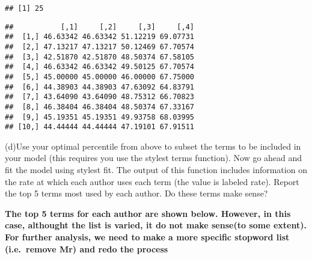 \documentclass[]{article}
\newenvironment{Shaded}{\begin{snugshade}}{\end{snugshade}}
\newcommand{\CommentTok}[1]{\textcolor[rgb]{0.56,0.35,0.01}{\textit{#1}}}
\newcommand{\OperatorTok}[1]{\textcolor[rgb]{0.81,0.36,0.00}{\textbf{#1}}}
\newcommand{\NormalTok}[1]{#1}
\begin{document}
\begin{verbatim}
## [1] 25
\end{verbatim}

\begin{Shaded}
\end{Shaded}

\begin{verbatim}
##           [,1]     [,2]     [,3]     [,4]
##  [1,] 46.63342 46.63342 51.12219 69.07731
##  [2,] 47.13217 47.13217 50.12469 67.70574
##  [3,] 42.51870 42.51870 48.50374 67.58105
##  [4,] 46.63342 46.63342 49.50125 67.70574
##  [5,] 45.00000 45.00000 46.00000 67.75000
##  [6,] 44.38903 44.38903 47.63092 64.83791
##  [7,] 43.64090 43.64090 48.75312 66.70823
##  [8,] 46.38404 46.38404 48.50374 67.33167
##  [9,] 45.19351 45.19351 49.93758 68.03995
## [10,] 44.44444 44.44444 47.19101 67.91511
\end{verbatim}

(d)Use your optimal percentile from above to subset the terms to be
included in your model (this requires you use the stylest terms
function). Now go ahead and fit the model using stylest fit. The output
of this function includes information on the rate at which each author
uses each term (the value is labeled rate). Report the top 5 terms most
used by each author. Do these terms make sense?

\textbf{The top 5 terms for each author are shown below. However, in
this case, althought the list is varied, it do not make sense(to some
extent). For further analysis, we need to make a more specific stopword
list (i.e.~remove Mr) and redo the process}
\end{document}
